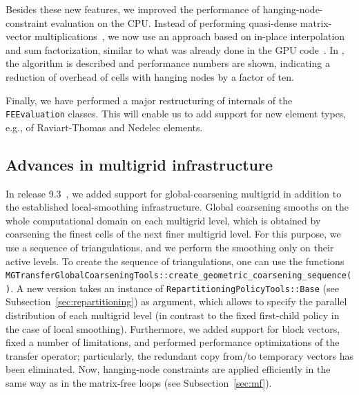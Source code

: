 \documentclass{ansarticle-preprint}
\begin{document}
Besides these new features, we improved the performance of
hanging-node-constraint evaluation on the CPU. Instead of performing
quasi-dense matrix-vector multiplications~\cite{KronbichlerKormann2012}, we now use an
approach based on in-place interpolation and sum factorization, similar
to what was already done in the GPU code~\cite{ljungkvist2017matrix}. In \cite{munch2022hn}, the algorithm is described
and performance numbers are shown, indicating a reduction
of overhead of cells with hanging nodes by a factor of ten.

Finally, we have performed a major restructuring of internals
of the \texttt{FEEvaluation} classes. This will enable us to add support for new element types, e.g., of
Raviart-Thomas and Nedelec elements.


%
%
%
%
%


\subsection{Advances in multigrid infrastructure}\label{sec:multigrid}

In release 9.3~\cite{dealII93}, we added support for global-coarsening multigrid in
addition to the established local-smoothing infrastructure. Global
coarsening smooths on the whole computational domain on each
multigrid level, which is obtained by coarsening the finest cells of
the next finer multigrid level.
For this purpose, we use a sequence of triangulations, and we perform
the smoothing only on their active levels. To create the sequence of
triangulations, one can use the functions \texttt{MGTransferGlobalCoarseningTools::create\_geometric\_coarsening\_sequence()}. A new version takes an
instance of \texttt{RepartitioningPolicyTools::Base} (see Subsection~\ref{sec:repartitioning}) as argument, which allows to specify the parallel
distribution of each multigrid level (in contrast to the fixed first-child policy in the case of local smoothing). Furthermore, we added support for block vectors,
fixed a number of limitations, and performed performance optimizations of
the transfer operator; particularly, the redundant copy from/to temporary vectors
has been eliminated. Now, hanging-node constraints are applied
efficiently in the same way as in the matrix-free loops (see Subsection~\ref{sec:mf}).
\end{document}
